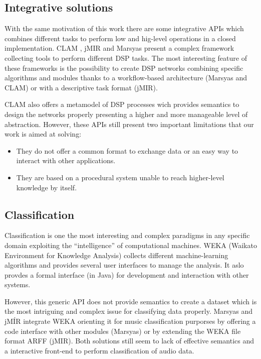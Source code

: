 \documentclass[runningheads]{llncs}
\begin{document}
\subsection{Integrative solutions}\label{subsec:inte}

With the same motivation of this work there are some integrative APIs which combines different tasks to perform low and hig-level operations in a closed implementation. CLAM \cite{clam}, jMIR \cite{jmir} and Marsyas \cite{marsyas} present a complex framework collecting tools to perform different DSP tasks. The most interesting feature of these frameworks is the possibility to create DSP networks combining specific algorithms and modules thanks to a workflow-based architecture (Marsyas and CLAM) or with a descriptive task format (jMIR).

CLAM also offers a metamodel of DSP processes wich provides semantics to design the networks properly presenting a higher and more manageable level of abstraction. However, these APIs still present two important limitations that our work is aimed at solving:

\begin{itemize}
 \item They do not offer a common format to exchange data or an easy way to interact with other applications.
 \item They are based on a procedural system unable to reach higher-level knowledge by itself.
\end{itemize}

\subsection{Classification}\label{subsec:classif}

Classification is one the most interesting and complex paradigms in any specific domain exploiting the ``intelligence'' of computational machines. WEKA (Waikato Environment for Knowledge Analysis) \cite{weka} collects different machine-learning algorithms and provides several user interfaces to manage the analysis. It aslo provdes a formal interface (in Java) for development and interaction with other systems.

However, this generic API does not provide semantics to create a dataset which is the most intriguing and complex issue for classifying data properly. Marsyas and jMÍR integrate WEKA orienting it for music classification purporses by offering a code interface with other modules (Marsyas) or by extending the WEKA file format ARFF (jMIR). Both solutions still seem to lack of effective semantics and a interactive front-end to perform classification of audio data.
\end{document}

